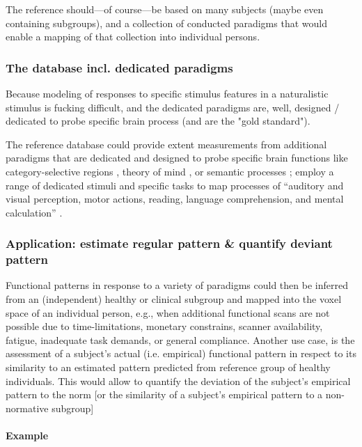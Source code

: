 %
The reference should---of course---be based on many subjects (maybe even
containing subgroups), and a collection of conducted paradigms that would enable
a mapping of that collection into individual persons.


\subsubsection{The database incl. dedicated paradigms}


%
Because modeling of responses to specific stimulus features in a naturalistic
stimulus is fucking difficult, and the dedicated paradigms are, well, designed /
dedicated to probe specific brain process (and are the "gold standard").

%
The reference database could provide extent measurements from additional
paradigms that are dedicated and designed to probe specific brain functions like
category-selective regions \citep{stigliani2015temporal}, theory of mind
\citep{spunt2014validating}, or semantic processes \citep{fedorenko2010new,
fernandez2001language};
%
employ a range of dedicated stimuli and specific tasks to map processes of
``auditory and visual perception, motor actions, reading, language
comprehension, and mental calculation'' \citep{pinel2007fast}.


\subsubsection{Application: estimate regular pattern \& quantify deviant
pattern}

%
Functional patterns in response to a variety of paradigms could then be inferred
from an (independent) healthy or clinical subgroup and mapped into the voxel
space of an individual person, e.g.,
%
when additional functional scans are not possible due to time-limitations,
monetary constrains, scanner availability, fatigue, inadequate task demands, or
general compliance.
%
Another use case, is the assessment of a subject's actual (i.e. empirical)
functional pattern in respect to its similarity to  an estimated pattern
predicted from reference group of healthy individuals.
%
This would allow to quantify the deviation of the subject's empirical pattern to
the norm [or the similarity of a subject's empirical pattern to a non-normative
subgroup]


\paragraph{Example}

